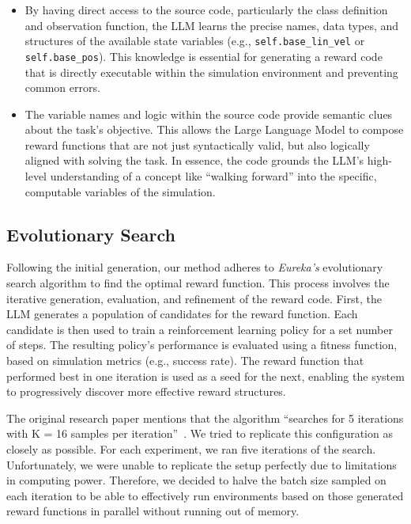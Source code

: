 \documentclass[10pt,twocolumn]{article}
\begin{document}
\begin{itemize}
    \item By having direct access to the source code, particularly the class definition and observation function, the LLM learns the precise names, data types, and structures of the available state variables (e.g., \texttt{self.base\_lin\_vel} or \texttt{self.base\_pos}). This knowledge is essential for generating a reward code that is directly executable within the simulation environment and preventing common errors.
    \item The variable names and logic within the source code provide semantic clues about the task's objective. This allows the Large Language Model to compose reward functions that are not just syntactically valid, but also logically aligned with solving the task. In essence, the code grounds the LLM's high-level understanding of a concept like ``walking forward'' into the specific, computable variables of the simulation.
\end{itemize}

\subsection{Evolutionary Search}

Following the initial generation, our method adheres to \textit{Eureka's} evolutionary search algorithm to find the optimal reward function. This process involves the iterative generation, evaluation, and refinement of the reward code. First, the LLM generates a population of candidates for the reward function. Each candidate is then used to train a reinforcement learning policy for a set number of steps. The resulting policy's performance is evaluated using a fitness function, based on simulation metrics (e.g., success rate). The reward function that performed best in one iteration is used as a seed for the next, enabling the system to progressively discover more effective reward structures.

The original research paper mentions that the algorithm ``searches for
5 iterations with K = 16 samples per iteration''~\cite{eureka}. We tried to replicate this configuration as closely as possible. For each experiment, we ran five iterations of the search. Unfortunately, we were unable to replicate the setup perfectly due to limitations in computing power. Therefore, we decided to halve the batch size sampled on each iteration to be able to effectively run environments based on those generated reward functions in parallel without running out of memory.
\end{document}
